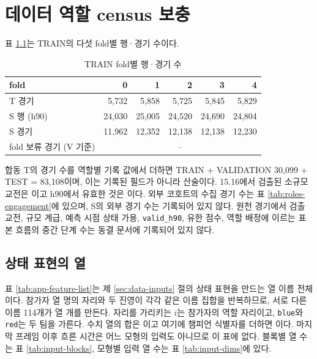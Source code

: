 \chapter{데이터 역할 census 보충}
\label{app:census}

표 \ref{tab:app-folds}는 TRAIN의 다섯 fold별 행·경기 수이다.

\begin{table}[H]
  \centering
  \caption{TRAIN fold별 행·경기 수}
  \label{tab:app-folds}
  \small
  \begin{tabular}{@{}lrrrrr@{}}
    \toprule
    fold & 0 & 1 & 2 & 3 & 4 \\
    \midrule
    T 경기 & 5{,}732 & 5{,}858 & 5{,}725 & 5{,}845 & 5{,}829 \\
    S 행 (h90) & 24{,}030 & 25{,}005 & 24{,}520 & 24{,}690 & 24{,}804 \\
    S 경기 & 11{,}962 & 12{,}352 & 12{,}138 & 12{,}138 & 12{,}230 \\
    fold 보류 경기 (V 기준) & \multicolumn{5}{c}{\foldHeldMin{}--\foldHeldMax{}} \\
    \bottomrule
  \end{tabular}
\end{table}

합동 T의 경기 수를 역할별 기록 값에서 더하면 TRAIN \numTTrainMatches{} + VALIDATION 30{,}099 + TEST \numTTestMatches{} = 83{,}108이며, 이는 기록된 필드가 아니라 산술이다. 15.16에서 검출된 소규모 교전은 \numSTestDetected{}이고 h90에서 유효한 것은 \numSTest{}이다. 외부 코호트의 수집 경기 수는 표 \ref{tab:roles-engagement}에 있으며, S의 외부 경기 수는 기록되어 있지 않다. 원천 경기에서 검출 교전, 규모 계급, 예측 시점 상태 가용, \texttt{valid\_h90}, 유한 점수, 역할 배정에 이르는 표본 흐름의 중간 단계 수는 동결 문서에 기록되어 있지 않다.

\section{상태 표현의 열}

표 \ref{tab:app-feature-list}는 제 \ref{sec:data-inputs} 절의 상태 표현을 만드는 열 이름 전체이다. 참가자 열 명의 자리와 두 진영이 각각 같은 이름 집합을 반복하므로, 서로 다른 이름 114개가 열 \dimExpanded{}개를 만든다. 자리를 가리키는 $i$는 참가자의 역할 자리이고, \texttt{blue}와 \texttt{red}는 두 팀을 가른다. 수치 열의 합은 \dimNumeric{}이고 여기에 챔피언 식별자를 더하면 \dimExpanded{}이다. 마지막 프레임 이후 흐른 시간은 어느 모형의 입력도 아니므로 이 표에 없다. 블록별 열 수는 표 \ref{tab:input-blocks}, 모형별 입력 열 수는 표 \ref{tab:input-dims}에 있다.


